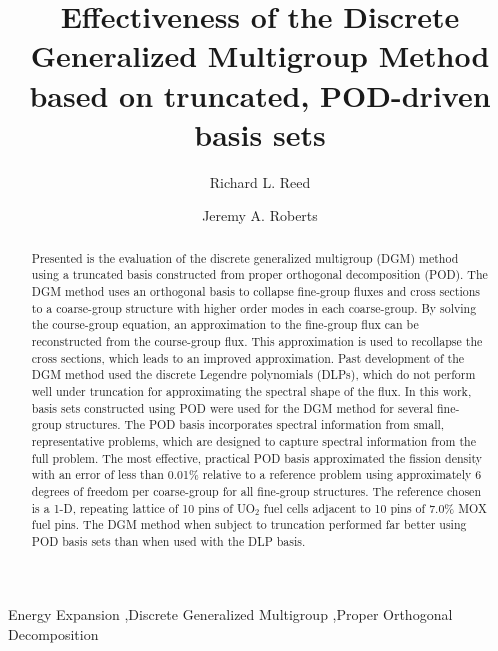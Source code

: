 \documentclass[5p,times,twocolumn,10pt]{elsarticle}
\begin{document}
    \begin{frontmatter}


        \title{Effectiveness of the Discrete Generalized Multigroup Method based on truncated, POD-driven basis sets}

        \author{Richard L. Reed}
        \author{Jeremy A. Roberts}

        \address{
            Mechanical and Nuclear Engineering, Kansas State University, Manhattan, KS
        }


        \begin{abstract}
            Presented is the evaluation of the discrete generalized multigroup (DGM) method using a truncated basis constructed from proper orthogonal decomposition (POD).
            The DGM method uses an orthogonal basis to collapse fine-group fluxes and cross sections to a coarse-group structure with higher order modes in each coarse-group.
            By solving the course-group equation, an approximation to the fine-group flux can be reconstructed from the course-group flux.
            This approximation is used to recollapse the cross sections, which leads to an improved approximation.
            Past development of the DGM method used the discrete Legendre polynomials (DLPs), which do not perform well under truncation for approximating the spectral shape of the flux.
            In this work, basis sets constructed using POD were used for the DGM method for several fine-group structures.
            The POD basis incorporates spectral information from small, representative problems, which are designed to capture spectral information from the full problem.
            The most effective, practical POD basis approximated the fission density with an error of less than 0.01\% relative to a reference problem using approximately 6 degrees of freedom per coarse-group for all fine-group structures.
            The reference chosen is a 1-D, repeating lattice of 10 pins of UO$_2$ fuel cells adjacent to 10 pins of 7.0\% MOX fuel pins.
            The DGM method when subject to truncation performed far better using POD basis sets than when used with the DLP basis.
        \end{abstract}

        \begin{keyword}
            Energy Expansion \sep Discrete Generalized Multigroup \sep Proper Orthogonal Decomposition


        \end{keyword}

    \end{frontmatter}
\end{document}
